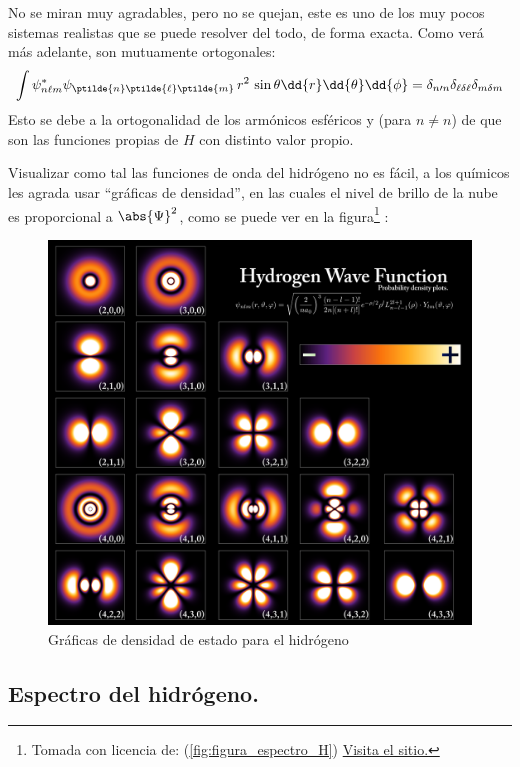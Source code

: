 No se miran muy agradables, pero no se quejan, este es uno de los muy pocos sistemas realistas que se puede resolver del todo, de forma exacta. Como verá más adelante, son mutuamente ortogonales:
\begin{align}
\int \psi_{n \ell m}^{*} \psi_{\ptilde{n} \ptilde{\ell} \ptilde{m}} \, r^{2} \, \sin \theta \dd{r} \dd{\theta} \dd{\phi} =  \delta_{n \prime{n}} \delta_{\ell \delta{\ell}} \delta_{m \delta{m}}
\label{eq:ecuacion_04_90}
\end{align}
Esto se debe a la ortogonalidad de los armónicos esféricos y (para $n \neq n$) de que son las funciones propias de $H$ con distinto valor propio.
\par
Visualizar como tal las funciones de onda del hidrógeno no es fácil, a los químicos les agrada usar \enquote{gráficas de densidad}, en las cuales el nivel de brillo de la nube es proporcional a $\abs{\Psi}^{2}$, como se puede ver en la figura\footnote{Tomada con licencia de:  (\ref{fig:figura_espectro_H}) \href{https://commons.wikimedia.org/wiki/File:Hydrogen_Density_Plots.png}{Visita el sitio.}} :
\begin{figure}[H]
    \centering
    \includegraphics[scale=0.15]{Imagenes/Hydrogen_Density_Plots.png}
    \caption{Gráficas de densidad de estado para el hidrógeno}
\end{figure}


\subsection{Espectro del hidrógeno.}

